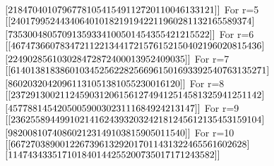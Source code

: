 \documentclass{article}
\begin{document}
$[218   4 704   0  10 796 778 105 415  49   1   1 272   0  11   0   0 461 33 121]]\\$
For r=5\\
$[[240  17  99 524  43 406 401   0 182 191  94 221 196   0  28   1 132 165 589 374]\\$
$[ 73 530   0  48   0   5 709 135 933   4   1   0   0 501 454 355  42  12 155  22]]\\$
For r=6\\
$[[467 473   6  60  78 347 211 221  34 417 215  76 152 150 402 196   0 208 154  36]\\$
$[224 902 856   1   0   3   0  28 472  87  24   0   0   0  13 952 409   0 3   5]]\\$
For r=7\\
$[[   6  140  138  183   86    0  103  452   56  228  256  696  150  169 339   25  407   63  135  271]\\$
$[ 860    2    0   32    0  420  961   13    1    0    5 1381    0   55 230    0   16    1    2    0]]\\$
For r=8\\
$[[ 23 729 130   0 211 245  90  31 206 156 127 494 125   1 458  13 259 412 51 142]\\$
$[457 788  14 542   0   5   0   0  59   0   0   3   0 231  11 684 924 213 1  47]]\\$
For r=9\\
$[[236 255  89   4 499 102 141   6  24 393 203  24 218   1 245 612 135 453 159 104]\\$
$[982   0   0 810   7   4   0  86   0 212  31 491   0 381   5 905   0  11 54   0]]\\$
For r=10\\
$[[ 667  270  389    0    0   12  267  396  132   92    0  170    1  143 132  246  556  160  262   8]\\$
$[1147    4    3   43  351   71    0  184    0    1  442   55  200  735 0   17   17  124    3  582]]\\$


\begin{figure}[h]
	\centering
	\qquad
	
	\centering
	\qquad
	
	\centering
\end{figure}
\end{document}
